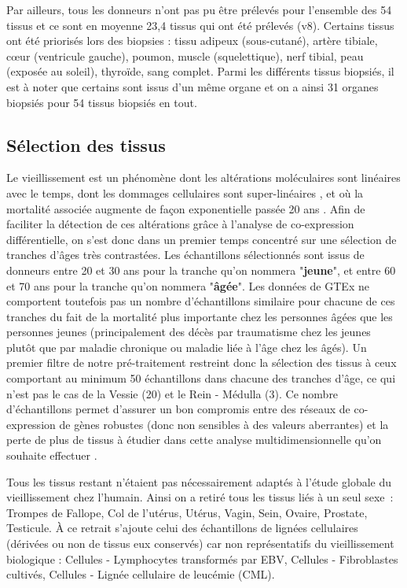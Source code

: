 Par ailleurs, tous les donneurs n'ont pas pu être prélevés pour l'ensemble des 54 tissus et ce sont en moyenne 23,4 tissus qui ont été prélevés (v8). Certains tissus ont été priorisés lors des biopsies : tissu adipeux (sous-cutané), artère tibiale, cœur (ventricule gauche), poumon, muscle (squelettique), nerf tibial, peau (exposée au soleil), thyroïde, sang complet. Parmi les différents tissus biopsiés, il est à noter que certains sont issus d'un même organe et on a ainsi 31 organes biopsiés pour 54 tissus biopsiés en tout.



\subsection{Sélection des tissus}

Le vieillissement est un phénomène dont les altérations moléculaires sont linéaires avec le temps, dont les dommages cellulaires sont super-linéaires , et où la mortalité associée augmente de façon exponentielle passée 20 ans . Afin de faciliter la détection de ces altérations grâce à l'analyse de co-expression différentielle, on s'est donc dans un premier temps concentré sur une sélection de tranches d'âges très contrastées. Les échantillons sélectionnés sont issus de donneurs entre 20 et 30 ans pour la tranche qu'on nommera "\textbf{jeune}", et entre 60 et 70 ans pour la tranche qu'on nommera "\textbf{âgée}". Les données de GTEx ne comportent toutefois pas un nombre d'échantillons similaire pour chacune de ces tranches du fait de la mortalité plus importante chez les personnes âgées que les personnes jeunes (principalement des décès par traumatisme chez les jeunes plutôt que par maladie chronique ou maladie liée à l'âge chez les âgés). Un premier filtre de notre pré-traitement restreint donc la sélection des tissus à ceux comportant au minimum 50 échantillons dans chacune des tranches d'âge, ce qui n'est pas le cas de la Vessie (20) et le Rein - Médulla (3). Ce nombre d'échantillons permet d'assurer un bon compromis entre des réseaux de co-expression de gènes robustes (donc non sensibles à des valeurs aberrantes) et la perte de plus de tissus à étudier dans cette analyse multidimensionnelle qu'on souhaite effectuer .

Tous les tissus restant n'étaient pas nécessairement adaptés à l'étude globale du vieillissement chez l'humain. Ainsi on a retiré tous les tissus liés à un seul sexe~: Trompes de Fallope, Col de l'utérus, Utérus, Vagin, Sein, Ovaire, Prostate, Testicule. À ce retrait s'ajoute celui des échantillons de lignées cellulaires (dérivées ou non de tissus eux conservés) car non représentatifs du vieillissement biologique : Cellules - Lymphocytes transformés par EBV, Cellules - Fibroblastes cultivés, Cellules - Lignée cellulaire de leucémie (CML). 



